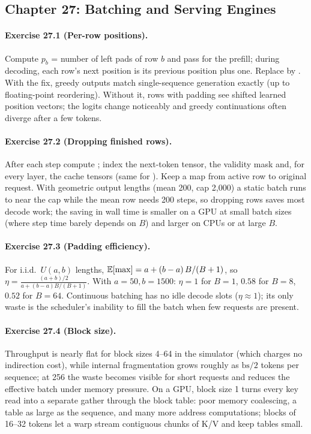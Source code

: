 \subsection*{Chapter 27: Batching and Serving Engines}

\paragraph{Exercise 27.1 (Per-row positions).}
Compute $p_b$ = number of left pads of row $b$ and pass  for
the prefill; during decoding, each row's next position is its previous position plus one. Replace
 by . With the fix, greedy
outputs match single-sequence generation exactly (up to floating-point reordering). Without it, rows with
padding see shifted learned position vectors; the logits change noticeably and greedy continuations often
diverge after a few tokens.

\paragraph{Exercise 27.2 (Dropping finished rows).}
After each step compute ; index the next-token tensor, the validity mask and, for
every layer, the cache tensors  (same for ). Keep a map from active row to
original request. With geometric output lengths (mean 200, cap 2,000) a static batch runs to near the cap
while the mean row needs 200 steps, so dropping rows saves most decode work; the saving in wall time is
smaller on a GPU at small batch sizes (where step time barely depends on $B$) and larger on CPUs or at large $B$.

\paragraph{Exercise 27.3 (Padding efficiency).}
For i.i.d.\ $U(a,b)$ lengths, $\mathbb{E}[\max]=a+(b-a)\,B/(B+1)$, so
$\eta=\frac{(a+b)/2}{a+(b-a)B/(B+1)}$. With $a=50,b=1500$: $\eta=1$ for $B=1$, $0.58$ for $B=8$, $0.52$ for $B=64$.
Continuous batching has no idle decode slots ($\eta\approx1$); its only waste is the scheduler's inability to
fill the batch when few requests are present.

\paragraph{Exercise 27.4 (Block size).}
Throughput is nearly flat for block sizes 4--64 in the simulator (which charges no indirection cost),
while internal fragmentation grows roughly as $\text{bs}/2$ tokens per sequence; at 256 the waste becomes
visible for short requests and reduces the effective batch under memory pressure. On a GPU, block size 1
turns every key read into a separate gather through the block table: poor memory coalescing, a table as
large as the sequence, and many more address computations; blocks of 16--32 tokens let a warp stream
contiguous chunks of K/V and keep tables small.

